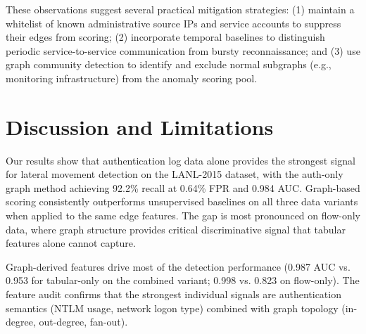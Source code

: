 \documentclass[letterpaper,twocolumn,10pt]{article}
\begin{document}
These observations suggest several practical mitigation strategies: (1) maintain a whitelist of known administrative source IPs and service accounts to suppress their edges from scoring; (2) incorporate temporal baselines to distinguish periodic service-to-service communication from bursty reconnaissance; and (3) use graph community detection to identify and exclude normal subgraphs (e.g., monitoring infrastructure) from the anomaly scoring pool.

\section{Discussion and Limitations}

Our results show that authentication log data alone provides the strongest signal for lateral movement detection on the LANL-2015 dataset, with the auth-only graph method achieving 92.2\% recall at 0.64\% FPR and 0.984 AUC. Graph-based scoring consistently outperforms unsupervised baselines on all three data variants when applied to the same edge features. The gap is most pronounced on flow-only data, where graph structure provides critical discriminative signal that tabular features alone cannot capture.

Graph-derived features drive most of the detection performance (0.987 AUC vs. 0.953 for tabular-only on the combined variant; 0.998 vs. 0.823 on flow-only). The feature audit confirms that the strongest individual signals are authentication semantics (NTLM usage, network logon type) combined with graph topology (in-degree, out-degree, fan-out).
\end{document}
